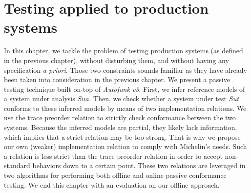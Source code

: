 %
\chapter{Testing applied to production systems}
\label{sec:testing}

In this chapter, we tackle the problem of testing production
systems (as defined in the previous chapter), without disturbing
them, and without having any specification \emph{a priori}. Those
two constraints sounds familiar as they have already been taken
into consideration in the previous chapter. We present a passive
testing technique built on-top of \emph{Autofunk v3}. First, we
infer reference models of a system under analysis $\mathit{Sua}$.
Then, we check whether a system under test $\mathit{Sut}$
conforms to these inferred models by means of two implementation
relations. We use the trace preorder relation to strictly check
conformance between the two systems. Because the inferred models
are partial, they likely lack information, which implies that a
strict relation may be too strong. That is why we propose our own
(weaker) implementation relation to comply with Michelin's needs.
Such a relation is less strict than the trace preorder relation
in order to accept non-standard behaviors down to a certain point.
These two relations are leveraged in two algorithms for
performing both offline and online passive conformance testing.
We end this chapter with an evaluation on our offline approach.\\

\minitoc

\pagebreak







\cleardoublepage
\blankpage
